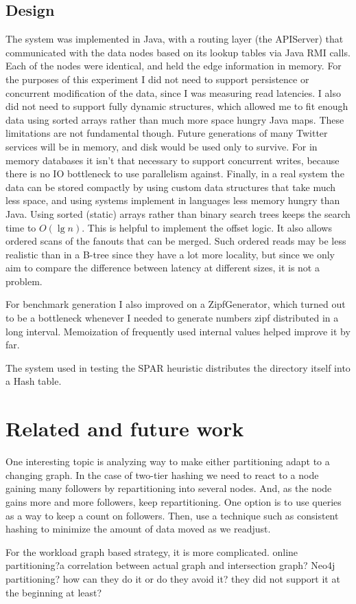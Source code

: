 \section{Design}

The system was implemented in Java, with a routing layer (the APIServer) that communicated with the data nodes based on its lookup tables via Java RMI calls. Each of the nodes were identical, and held the edge information in memory. For the purposes of this experiment I did not need to support persistence or concurrent modification of the data, since I was measuring read latencies.  I also did not need to support fully dynamic structures, which allowed me to fit enough data using sorted arrays rather than much more space hungry Java maps. These limitations are not fundamental though. Future generations of many Twitter services will be in memory, and disk would be used only to survive. For in memory databases it isn't that necessary to support concurrent writes, because there is no IO bottleneck to use parallelism against. Finally, in a real system the data can be stored compactly by using custom data structures that take much less space, and using systems implement in languages less memory hungry than Java.  Using sorted (static) arrays rather than binary search trees keeps the search time to $O(\lg{n})$. This is helpful to implement the offset logic. It also allows ordered scans of the fanouts that can be merged. Such ordered reads may be less realistic than in a B-tree since they have a lot more locality, but since we only aim to compare the difference between latency at different sizes, it is not a problem.

For benchmark generation I also improved on a ZipfGenerator, which turned out to be a bottleneck whenever I needed to generate numbers zipf distributed in a long interval. Memoization of frequently used internal values helped improve it by far.

The system used in testing the SPAR  heuristic distributes the directory itself into a Hash table.


\chapter{Related and future work}

One interesting topic is analyzing way to make either partitioning adapt to a changing graph. In the case of two-tier hashing we need to react to a node gaining many followers  by repartitioning into several nodes. And, as the node gains more and more followers, keep repartitioning. One option is to use queries as a way to keep a count on followers. Then, use a technique such as consistent hashing to minimize the amount of data moved as we readjust.

For the workload graph based strategy, it is more complicated.  
online partitioning?a
correlation between actual graph and intersection graph?
Neo4j partitioning? how can they do it or do they avoid it? they did not support it at the beginning at least?


